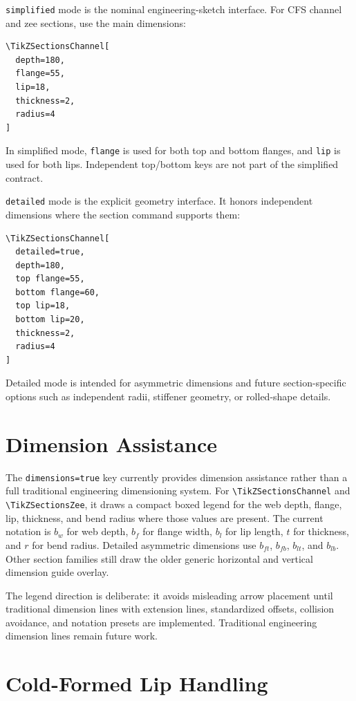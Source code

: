 \documentclass[10pt]{article}
\newcommand{\command}[1]{\texttt{\textbackslash #1}}
\newcommand{\keyname}[1]{\texttt{#1}}
\begin{document}
\keyname{simplified} mode is the nominal engineering-sketch interface. For CFS
channel and zee sections, use the main dimensions:

\begin{lstlisting}
\TikZSectionsChannel[
  depth=180,
  flange=55,
  lip=18,
  thickness=2,
  radius=4
]
\end{lstlisting}

In simplified mode, \keyname{flange} is used for both top and bottom flanges,
and \keyname{lip} is used for both lips. Independent top/bottom keys are not
part of the simplified contract.

\keyname{detailed} mode is the explicit geometry interface. It honors
independent dimensions where the section command supports them:

\begin{lstlisting}
\TikZSectionsChannel[
  detailed=true,
  depth=180,
  top flange=55,
  bottom flange=60,
  top lip=18,
  bottom lip=20,
  thickness=2,
  radius=4
]
\end{lstlisting}

Detailed mode is intended for asymmetric dimensions and future
section-specific options such as independent radii, stiffener geometry, or
rolled-shape details.

\section{Dimension Assistance}

The \keyname{dimensions=true} key currently provides dimension assistance rather
than a full traditional engineering dimensioning system. For
\command{TikZSectionsChannel} and \command{TikZSectionsZee}, it draws a compact
boxed legend for the web depth, flange, lip, thickness, and bend radius where
those values are present. The current notation is \(b_w\) for web depth, \(b_f\)
for flange width, \(b_l\) for lip length, \(t\) for thickness, and \(r\) for
bend radius. Detailed asymmetric dimensions use \(b_{ft}\), \(b_{fb}\),
\(b_{lt}\), and \(b_{lb}\). Other section families still draw the older generic
horizontal and vertical dimension guide overlay.

The legend direction is deliberate: it avoids misleading arrow placement until
traditional dimension lines with extension lines, standardized offsets,
collision avoidance, and notation presets are implemented. Traditional
engineering dimension lines remain future work.

\section{Cold-Formed Lip Handling}
\end{document}
